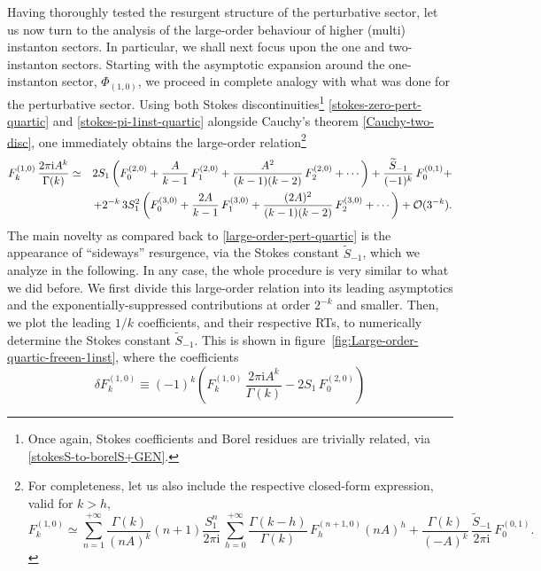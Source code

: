 \documentclass[11pt,a4paper]{article}
\newcommand{\be}{\begin{equation}}
\newcommand{\ee}{\end{equation}}
\newcommand{\rmi}{{\mathrm{i}}}
\begin{document}
Having thoroughly tested the resurgent structure of the perturbative sector, let us now turn to the analysis of the large-order behaviour of higher (multi) instanton sectors. In particular, we shall next focus upon the one and two-instanton sectors. Starting with the asymptotic expansion around the one-instanton sector, $\Phi_{(1,0)}$, we proceed in complete analogy with what was done for the perturbative sector. Using both Stokes discontinuities\footnote{Once again, Stokes coefficients and Borel residues are trivially related, via \eqref{stokesS-to-borelS+GEN}.} \eqref{stokes-zero-pert-quartic} and \eqref{stokes-pi-1inst-quartic} alongside Cauchy's theorem \eqref{Cauchy-two-disc}, one immediately obtains the large-order relation\footnote{For completeness, let us also include the respective closed-form expression, valid for $k>h$,
%
\be
F_{k}^{(1,0)} \simeq \sum_{n=1}^{+\infty} \frac{\Gamma(k)}{\left( n A \right)^k} \left( n+1 \right) \frac{S_1^n}{2\pi\rmi}\, \sum_{h=0}^{+\infty} \frac{\Gamma(k-h)}{\Gamma(k)}\, F_{h}^{(n+1,0)} \left( n A \right)^{h} + \frac{\Gamma(k)}{\left( - A \right)^k}\, \frac{\widetilde{S}_{-1}}{2\pi\rmi}\, F_0^{(0,1)}.
\ee
}
%
\begin{eqnarray}
F_{k}^{(1,0)}\, \frac{2\pi\rmi A^k}{\Gamma(k)} &\simeq& 2S_1 \left( F_0^{(2,0)} + \frac{A}{k-1}\, F_1^{(2,0)} + \frac{A^2}{(k-1)(k-2)}\, F_2^{(2,0)} + \cdots \right) + \frac{\widetilde{S}_{-1}}{(-1)^k}\, F_0^{(0,1)} + \nonumber\\
&&
\hspace*{-30pt}
+ 2^{-k}\, 3 S_1^2 \left( F_0^{(3,0)} + \frac{2A}{k-1}\, F_1^{(3,0)} + \frac{(2A)^2}{(k-1)(k-2)}\, F_2^{(3,0)} + \cdots \right) + \mathcal{O}(3^{-k}).
\label{large-order-1-inst-quartic}
\end{eqnarray}
%
\noindent
The main novelty as compared back to \eqref{large-order-pert-quartic} is the appearance of ``sideways'' resurgence, via the Stokes constant $\widetilde{S}_{-1}$, which we analyze in the following. In any case, the whole procedure is very similar to what we did before. We first divide this large-order relation into its leading asymptotics and the exponentially-suppressed contributions at order $2^{-k}$ and smaller. Then, we plot the leading $1/k$ coefficients, and their respective RTs, to numerically determine the Stokes constant $\widetilde{S}_{-1}$. This is shown in figure~\ref{fig:Large-order-quartic-freeen-1inst}, where the coefficients
%
\be
\delta F_k^{(1,0)} \equiv \left(-1\right)^k \left( F_{k}^{(1,0)}\, \frac{2\pi\rmi A^k}{\Gamma(k)} - 2S_1\, F_0^{(2,0)}\right)
\ee
% 
\noindent
\end{document}

